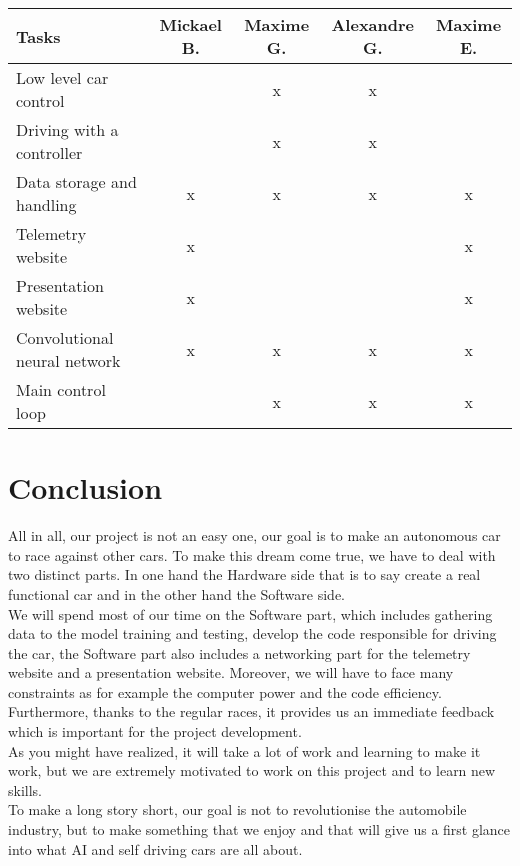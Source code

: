 \documentclass[12pt]{article}
\begin{document}
\begin{tabular}{|l|c|c|c|c|} 
\hline
Tasks                        & Mickael B. & Maxime G. & Alexandre G. & Maxime E.  \\ 
\hline
Low level car control        &            & x         & x            &            \\ 
\hline
Driving with a controller    &            & x         & x            &            \\ 
\hline
Data storage and handling    & x          & x         & x            & x          \\ 
\hline
Telemetry website            & x          &           &              & x          \\ 
\hline
Presentation website         & x          &           &              & x          \\ 
\hline
Convolutional neural network & x          & x         & x            & x          \\ 
\hline
Main control loop            &            & x         & x            & x          \\
\hline
\end{tabular}

\section {Conclusion}
All in all, our project is not an easy one, our goal is to make an autonomous car to race against other cars. To make this dream come true,  we have to deal with two distinct parts.
In one hand the Hardware side that is to say create a real functional car and in the other hand the Software side. \\
We will spend most of our time on the Software part, which includes gathering data to the model training and testing, develop the code responsible for driving the car, the Software part also includes a networking part for the telemetry website and a presentation website. 
Moreover, we will have to face  many constraints as for example the computer power and the code efficiency.
Furthermore, thanks to the regular races, it provides us an immediate feedback which is important for the project development. \\
As you might have realized, it will take a lot of work and learning to make it work, but we are extremely motivated to work on this project and to learn new skills. \\

To make a long story short, our goal is not to revolutionise the automobile industry, but to make something that we enjoy and that will give us a first glance into what AI and self driving cars are all about.
\end{document}
